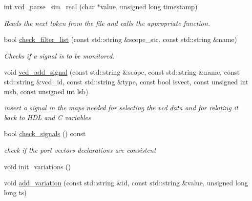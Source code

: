 \begin{DoxyCompactItemize}
int \hyperlink{classvcd__parser_a0cec69a0f950aa8fb3cf7804b6f89045}{vcd\+\_\+parse\+\_\+sim\+\_\+real} (char $\ast$value, unsigned long timestamp)
\begin{DoxyCompactList}\small\item\em Reads the next token from the file and calls the appropriate function. \end{DoxyCompactList}\item 
bool \hyperlink{classvcd__parser_a493834428198caf956a97a730693b3d2}{check\+\_\+filter\+\_\+list} (const std\+::string \&scope\+\_\+str, const std\+::string \&name)
\begin{DoxyCompactList}\small\item\em Checks if a signal is to be monitored. \end{DoxyCompactList}\item 
void \hyperlink{classvcd__parser_a044276a15d40eb898d7b34584c11776c}{vcd\+\_\+add\+\_\+signal} (const std\+::string \&scope, const std\+::string \&name, const std\+::string \&vcd\+\_\+id, const std\+::string \&type, const bool isvect, const unsigned int msb, const unsigned int lsb)
\begin{DoxyCompactList}\small\item\em insert a signal in the maps needed for selecting the vcd data and for relating it back to H\+DL and C variables \end{DoxyCompactList}\item 
bool \hyperlink{classvcd__parser_a094db21ee543d294fda6891691016dee}{check\+\_\+signals} () const
\begin{DoxyCompactList}\small\item\em check if the port vectors declarations are consistent \end{DoxyCompactList}\item 
void \hyperlink{classvcd__parser_a249f081203e3ccdb3af66ea16587d30d}{init\+\_\+variations} ()
\item 
void \hyperlink{classvcd__parser_ae385037530fb4eb1d8eac4853b92a758}{add\+\_\+variation} (const std\+::string \&id, const std\+::string \&value, unsigned long long ts)
\end{DoxyCompactItemize}
